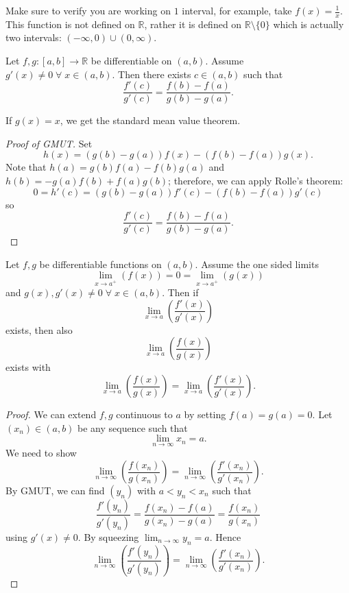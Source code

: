\begin{remark}
    Make sure to verify you are working on $1$ interval, for example, take $f(x) = \frac{1}{x}$. This function is not defined on $\mathbb{R}$, rather it is defined on $\mathbb{R} \setminus \{ 0 \}$ which is actually two intervals: $(-\infty, 0) \cup (0, \infty)$.
\end{remark}

\begin{theorem}
    Let $f, g : [a, b] \to \mathbb{R}$ be differentiable on $(a, b)$. Assume $g'(x) \neq 0 \; \forall \; x \in (a, b)$. Then there exists $c \in (a, b)$ such that \[ \frac{f'(c)}{g'(c)} = \frac{f(b) - f(a)}{g(b) - g(a)}. \]
\end{theorem}

\begin{remark}
    If $g(x) = x$, we get the standard mean value theorem.
\end{remark}

\begin{proof}[Proof of GMUT]
    Set \[ h(x) = (g(b) - g(a)) f(x) - (f(b) - f(a)) g(x). \] Note that $h(a) = g(b) f(a) - f(b) g(a)$ and $h(b) = -g(a) f(b) + f(a) g(b)$; therefore, we can apply Rolle's theorem: \[ 0 = h'(c) = (g(b) - g(a)) f'(c) - (f(b) - f(a)) g'(c) \] so \[ \frac{f'(c)}{g'(c)} = \frac{f(b) - f(a)}{g(b) - g(a)}. \]
\end{proof}

\begin{theorem}
    Let $f, g$ be differentiable functions on $(a, b)$. Assume the one sided limits \[ \lim_{x \to a^+} \left( f(x) \right) = 0 = \lim_{x \to a^+} \left( g(x) \right) \] and $g(x), g'(x) \neq 0 \; \forall \; x \in (a, b)$. Then if \[ \lim_{x \to a} \left( \frac{f'(x)}{g'(x)} \right) \] exists, then also \[ \lim_{x \to a} \left( \frac{f(x)}{g(x)} \right) \] exists with \[ \lim_{x \to a} \left( \frac{f(x)}{g(x)} \right) = \lim_{x \to a} \left( \frac{f'(x)}{g'(x)} \right). \]
\end{theorem}

\begin{proof}
    We can extend $f, g$ continuous to $a$ by setting $f(a) = g(a) = 0$. Let $(x_n) \in (a, b)$ be any sequence such that \[ \lim_{n \to \infty} x_n = a. \] We need to show \[ \lim_{n \to \infty} \left( \frac{f(x_n)}{g(x_n)} \right) = \lim_{n \to \infty} \left( \frac{f'(x_n)}{g'(x_n)} \right). \] By GMUT, we can find $(y_n)$ with $a < y_n < x_n$ such that \[ \frac{f'(y_n)}{g'(y_n)} = \frac{f(x_n) - f(a)}{g(x_n) - g(a)} = \frac{f(x_n)}{g(x_n)} \] using $g'(x) \neq 0$. By squeezing $\lim_{n \to \infty} y_n = a$. Hence \[ \lim_{n \to \infty} \left( \frac{f'(y_n)}{g'(y_n)} \right) = \lim_{n \to \infty} \left( \frac{f'(x_n)}{g'(x_n)} \right). \]
\end{proof}


